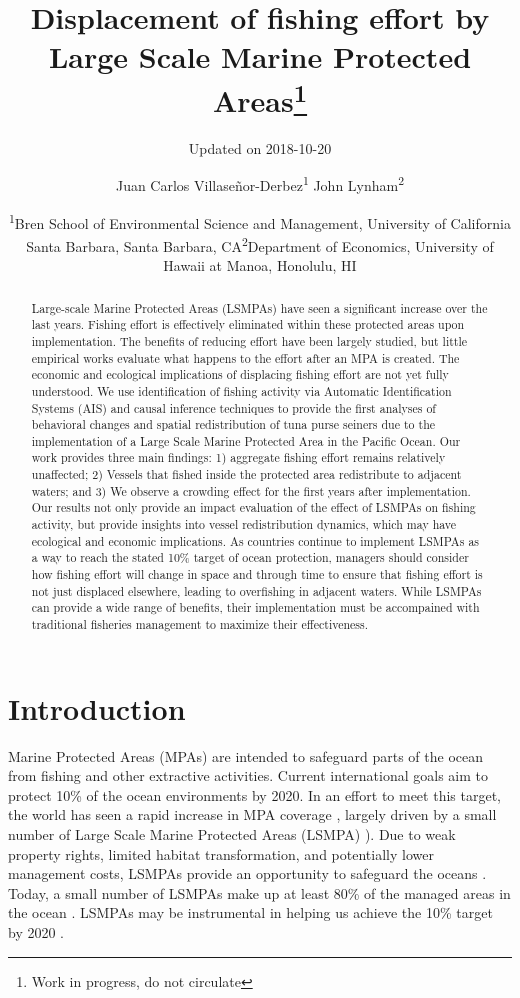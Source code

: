 \documentclass[11pt,]{article}
\title{Displacement of fishing effort by Large Scale Marine Protected
Areas\footnote{Work in progress, do not circulate}}
\subtitle{Updated on 2018-10-20}
\author{Juan Carlos Villaseñor-Derbez\textsuperscript{1} John
Lynham\textsuperscript{2}}
\date{\textsuperscript{1}Bren School of Environmental Science and Management,
University of California Santa Barbara, Santa Barbara,
CA\newline \textsuperscript{2}Department of Economics, University of
Hawaii at Manoa, Honolulu, HI}
\begin{document}
\maketitle
\begin{abstract}
Large-scale Marine Protected Areas (LSMPAs) have seen a significant
increase over the last years. Fishing effort is effectively eliminated
within these protected areas upon implementation. The benefits of
reducing effort have been largely studied, but little empirical works
evaluate what happens to the effort after an MPA is created. The
economic and ecological implications of displacing fishing effort are
not yet fully understood. We use identification of fishing activity via
Automatic Identification Systems (AIS) and causal inference techniques
to provide the first analyses of behavioral changes and spatial
redistribution of tuna purse seiners due to the implementation of a
Large Scale Marine Protected Area in the Pacific Ocean. Our work
provides three main findings: 1) aggregate fishing effort remains
relatively unaffected; 2) Vessels that fished inside the protected area
redistribute to adjacent waters; and 3) We observe a crowding effect for
the first years after implementation. Our results not only provide an
impact evaluation of the effect of LSMPAs on fishing activity, but
provide insights into vessel redistribution dynamics, which may have
ecological and economic implications. As countries continue to implement
LSMPAs as a way to reach the stated 10\% target of ocean protection,
managers should consider how fishing effort will change in space and
through time to ensure that fishing effort is not just displaced
elsewhere, leading to overfishing in adjacent waters. While LSMPAs can
provide a wide range of benefits, their implementation must be
accompained with traditional fisheries management to maximize their
effectiveness.
\end{abstract}

\clearpage

\hypertarget{introduction}{%
\section{Introduction}\label{introduction}}

Marine Protected Areas (MPAs) are intended to safeguard parts of the
ocean from fishing and other extractive activities. Current
international goals aim to protect 10\% of the ocean environments by
2020. In an effort to meet this target, the world has seen a rapid
increase in MPA coverage \citep{wood_2008,sala_2018}, largely driven by
a small number of Large Scale Marine Protected Areas (LSMPA)
\citet{singleton_2014,boonzaier_2016,alger_2017}). Due to weak property
rights, limited habitat transformation, and potentially lower management
costs, LSMPAs provide an opportunity to safeguard the oceans
\citet{game_2009}. Today, a small number of LSMPAs make up at least 80\%
of the managed areas in the ocean \citet{toonen_2013}. LSMPAs may be
instrumental in helping us achieve the 10\% target by 2020
\citep{mccauley_2016}.
\end{document}
